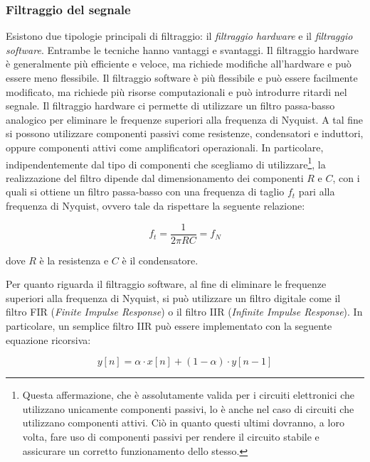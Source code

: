 \documentclass[a4paper,12pt]{report}  %
\begin{document}
\subsubsection{Filtraggio del segnale}\label{sec:filtering}
Esistono due tipologie principali di filtraggio: il \textit{filtraggio hardware} e il \textit{filtraggio software}.
Entrambe le tecniche hanno vantaggi e svantaggi.
Il filtraggio hardware è generalmente più efficiente e veloce, ma richiede modifiche all'hardware e può essere meno flessibile.
Il filtraggio software è più flessibile e può essere facilmente modificato, ma richiede più risorse computazionali e può introdurre ritardi nel segnale.
Il filtraggio hardware ci permette di utilizzare un filtro passa-basso analogico per eliminare le frequenze superiori alla frequenza di Nyquist.
A tal fine si possono utilizzare componenti passivi come resistenze, condensatori e induttori, oppure componenti attivi come amplificatori operazionali.
In particolare, indipendentemente dal tipo di componenti che scegliamo di utilizzare\footnote{Questa affermazione, che è assolutamente valida per i circuiti elettronici che utilizzano unicamente componenti passivi, lo è anche nel caso di circuiti che utilizzano componenti attivi. Ciò in quanto questi ultimi dovranno, a loro volta, fare uso di componenti passivi per rendere il circuito stabile e assicurare un corretto funzionamento dello stesso.}, la realizzazione del filtro dipende dal dimensionamento dei componenti $R$ e $C$, con i quali si ottiene un filtro passa-basso con una frequenza di taglio $f_t$ pari alla frequenza di Nyquist, ovvero tale da rispettare la seguente relazione:

\begin{equation}
    f_t = \frac{1}{2 \pi R C} = f_N \nonumber
\end{equation}

dove $R$ è la resistenza e $C$ è il condensatore.

Per quanto riguarda il filtraggio software, al fine di eliminare le frequenze superiori alla frequenza di Nyquist, si può utilizzare un filtro digitale come il filtro FIR (\textit{Finite Impulse Response}) o il filtro IIR (\textit{Infinite Impulse Response}).
In particolare, un semplice filtro IIR può essere implementato con la seguente equazione ricorsiva:

\begin{equation}
    y[n] = \alpha \cdot x[n] + (1 - \alpha) \cdot y[n - 1] \nonumber
\end{equation}
\end{document}
